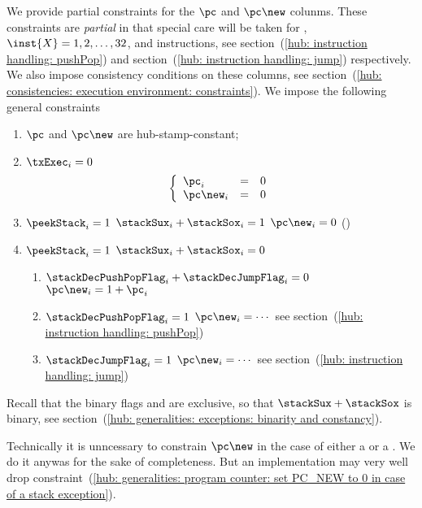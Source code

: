 We provide partial constraints for the $\pc$ and $\pc\new$ colunms.
These constraints are \emph{partial} in that special care will be taken for , $\inst{X} = 1, 2, \dots, 32$, and  instructions, see
section~(\ref{hub: instruction handling: pushPop}) and
section~(\ref{hub: instruction handling: jump}) respectively.
We also impose consistency conditions on these columns, see
section~(\ref{hub: consistencies: execution environment: constraints}).
We impose the following general constraints
\begin{enumerate}
	\item $\pc$ and $\pc\new$ are hub-stamp-constant;
	\item \If $\txExec_{i} = 0$ \Then
		\[
			\left\{ \begin{array}{lcl}
				\pc     _{i} & = & 0 \\
				\pc\new _{i} & = & 0 \\
			\end{array} \right.
		\]
	\item \label{hub: generalities: program counter: set PC_NEW to 0 in case of a stack exception}
		\If $\peekStack_{i} = 1$ \et $\stackSux_{i} + \stackSox_{i} = 1$ \Then $\pc\new_{i} = 0$ \quad (\trash)
	\item \If $\peekStack_{i} = 1$ \et $\stackSux_{i} + \stackSox_{i} = 0$
		\begin{enumerate}
			\item \If $\stackDecPushPopFlag_{i} + \stackDecJumpFlag_{i} = 0$ \Then $\pc\new_{i} = 1 + \pc_{i}$
			\item \If $\stackDecPushPopFlag_{i}                         = 1$ \Then $\pc\new_{i} = \cdots$ see section~(\ref{hub: instruction handling: pushPop})
			\item \If $                           \stackDecJumpFlag_{i} = 1$ \Then $\pc\new_{i} = \cdots$ see section~(\ref{hub: instruction handling: jump})
		\end{enumerate}
\end{enumerate}
\saNote{}
Recall that the binary flags
\stackSux{} and
\stackSox{}
are exclusive, so that $\stackSux + \stackSox$ is binary,
see section~(\ref{hub: generalities: exceptions: binarity and constancy}).

\saNote{}
Technically it is unncessary to constrain $\pc\new$ in the case of either a \suxSH{} or a \soxSH{}.
We do it anywas for the sake of completeness.
But an implementation may very well drop
constraint~(\ref{hub: generalities: program counter: set PC_NEW to 0 in case of a stack exception}).
